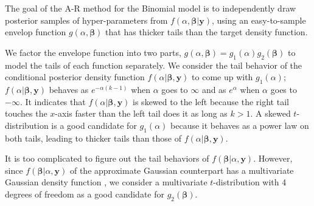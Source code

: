 \documentclass[article]{jss}
\begin{document}
The goal of the A-R method  for the  Binomial model is to independently draw  posterior samples of hyper-parameters from $f(\alpha, \boldsymbol{\beta}\vert \boldsymbol{y})$, using an easy-to-sample envelop function $g(\alpha, \boldsymbol{\beta})$ that has thicker tails than the target density function. 

We factor the envelope function into two parts, $g(\alpha, \boldsymbol{\beta})=g_1(\alpha)g_2(\boldsymbol{\beta})$ to model the tails of each function separately. We consider the tail behavior of the conditional posterior density function $f(\alpha \vert \boldsymbol{\beta},  \boldsymbol{y})$ to come up with $g_1(\alpha)$; $f(\alpha \vert \boldsymbol{\beta},  \boldsymbol{y})$ behaves as $e^{-\alpha(k-1)}$ when $\alpha$ goes to $\infty$ and as $e^{\alpha}$ when $\alpha$ goes to $-\infty$. It indicates that $f(\alpha \vert \boldsymbol{\beta},  \boldsymbol{y})$ is skewed to the left because the right tail touches the $x$-axis faster than the left tail does it as long as $k>1$.  A skewed $t$-distribution  is a good candidate for $g_1(\alpha)$ because it behaves as a power law on both tails, leading to thicker tails than those of $f(\alpha \vert \boldsymbol{\beta},  \boldsymbol{y})$. 

It is too complicated to figure out the tail behaviors of $f(\boldsymbol{\beta} \vert \alpha,  \boldsymbol{y})$. However, since $f(\boldsymbol{\beta} \vert \alpha,  \boldsymbol{y})$ of the approximate Gaussian counterpart has a multivariate Gaussian density function \citep{tang2011, kelly2014advances}, we consider a multivariate $t$-distribution with 4  degrees of freedom as a good candidate for $g_2(\boldsymbol{\beta})$.
\end{document}
